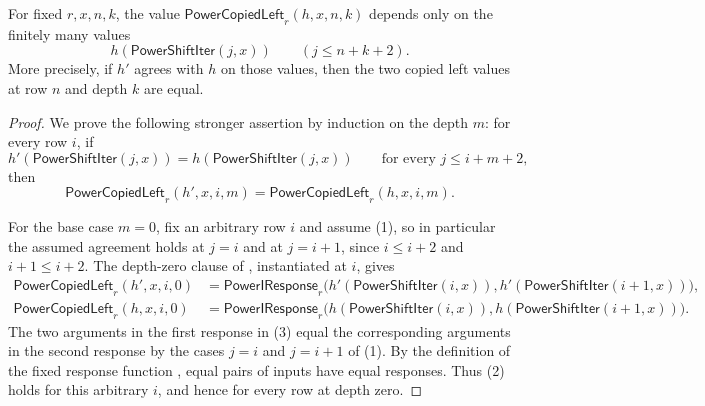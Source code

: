 \begin{lemma}
For fixed $r,x,n,k$, the value
$\mathsf{PowerCopiedLeft}_r(h,x,n,k)$ depends only on the finitely many
values
\[
h(\mathsf{PowerShiftIter}(j,x))\qquad (j\le n+k+2).
\]
More precisely, if $h'$ agrees with $h$ on those values, then the two copied
left values at row $n$ and depth $k$ are equal.
\end{lemma}
\begin{proof}
We prove the following stronger assertion by induction on the depth $m$:
for every row $i$, if
\[
 h'(\mathsf{PowerShiftIter}(j,x))
 =h(\mathsf{PowerShiftIter}(j,x))
 \qquad\text{for every }j\leq i+m+2,
 \tag{1}
\]
then
\[
 \mathsf{PowerCopiedLeft}_r(h',x,i,m)
 =\mathsf{PowerCopiedLeft}_r(h,x,i,m).
 \tag{2}
\]

For the base case $m=0$, fix an arbitrary row $i$ and assume (1), so in
particular the assumed agreement holds at $j=i$ and at $j=i+1$, since
$i\leq i+2$ and $i+1\leq i+2$.  The depth-zero clause of
, instantiated at $i$, gives
\[
\begin{aligned}
\mathsf{PowerCopiedLeft}_r(h',x,i,0)
  &=\mathsf{PowerIResponse}_r\bigl(
      h'(\mathsf{PowerShiftIter}(i,x)),
      h'(\mathsf{PowerShiftIter}(i+1,x))\bigr),\\
\mathsf{PowerCopiedLeft}_r(h,x,i,0)
  &=\mathsf{PowerIResponse}_r\bigl(
      h(\mathsf{PowerShiftIter}(i,x)),
      h(\mathsf{PowerShiftIter}(i+1,x))\bigr).
\end{aligned}
\tag{3}
\]
The two arguments in the first response in (3) equal the corresponding
arguments in the second response by the cases $j=i$ and $j=i+1$ of (1).
By the definition of the fixed response function
, equal pairs of inputs have equal responses.
Thus (2) holds for this arbitrary $i$, and hence for every row at depth
zero.


\end{proof}
